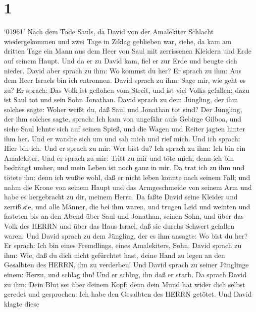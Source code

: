 \hypertarget{section}{%
\section{1}\label{section}}

 `01961' Nach dem Tode Sauls, da David von der Amalekiter
Schlacht wiedergekommen und zwei Tage in Ziklag geblieben war,
 siehe, da kam am dritten Tage ein Mann aus dem Heer von
Saul mit zerrissenen Kleidern und Erde auf seinem Haupt. Und da er zu
David kam, fiel er zur Erde und beugte sich nieder.  David
aber sprach zu ihm: Wo kommst du her? Er sprach zu ihm: Aus dem Heer
Israels bin ich entronnen.  David sprach zu ihm: Sage mir,
wie geht es zu? Er sprach: Das Volk ist geflohen vom Streit, und ist
viel Volks gefallen; dazu ist Saul tot und sein Sohn Jonathan.
 David sprach zu dem Jüngling, der ihm solches sagte: Woher
weißt du, daß Saul und Jonathan tot sind?  Der Jüngling, der
ihm solches sagte, sprach: Ich kam von ungefähr aufs Gebirge Gilboa, und
siehe Saul lehnte sich auf seinen Spieß, und die Wagen und Reiter jagten
hinter ihm her.  Und er wandte sich um und sah mich und rief
mich. Und ich sprach: Hier bin ich.  Und er sprach zu mir:
Wer bist du? Ich sprach zu ihm: Ich bin ein Amalekiter.  Und
er sprach zu mir: Tritt zu mir und töte mich; denn ich bin bedrängt
umher, und mein Leben ist noch ganz in mir.  Da trat ich zu
ihm und tötete ihn; denn ich wußte wohl, daß er nicht leben konnte nach
seinem Fall; und nahm die Krone von seinem Haupt und das Armgeschmeide
von seinem Arm und habe es hergebracht zu dir, meinem Herrn.
 Da faßte David seine Kleider und zerriß sie, und alle
Männer, die bei ihm waren,  und trugen Leid und weinten und
fasteten bis an den Abend über Saul und Jonathan, seinen Sohn, und über
das Volk des HERRN und über das Haus Israel, daß sie durchs Schwert
gefallen waren.  Und David sprach zu dem Jüngling, der es
ihm ansagte: Wo bist du her? Er sprach: Ich bin eines Fremdlings, eines
Amalekiters, Sohn.  David sprach zu ihm: Wie, daß du dich
nicht gefürchtet hast, deine Hand zu legen an den Gesalbten des HERRN,
ihn zu verderben!  Und David sprach zu seiner Jünglinge
einem: Herzu, und schlag ihn! Und er schlug, ihn daß er starb.
 Da sprach David zu ihm: Dein Blut sei über deinem Kopf;
denn dein Mund hat wider dich selbst geredet und gesprochen: Ich habe
den Gesalbten des HERRN getötet.  Und David klagte diese
